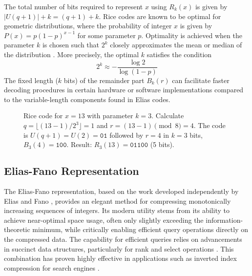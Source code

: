 The total number of bits required to represent $x$ using $R_k(x)$ is given by $|U(q+1)| + k = (q+1) + k$. Rice codes are known to be optimal for geometric distributions, where the probability of integer $x$ is given by $P(x) = p(1-p)^{x-1}$ for some parameter $p$. Optimality is achieved when the parameter $k$ is chosen such that $2^k$ closely approximates the mean or median of the distribution \cite{witten1999managing}. More precisely, the optimal $k$ satisfies the condition
\[ 2^k \approx -\frac{\log 2}{\log(1-p)} \]
The fixed length ($k$ bits) of the remainder part $B_k(r)$ can facilitate faster decoding procedures in certain hardware or software implementations compared to the variable-length components found in Elias codes.

\begin{figure}[hbtp]
    \centering
    \caption{Rice code for $x=13$ with parameter $k=3$. Calculate $q = \lfloor (13-1) / 2^3 \rfloor = 1$ and $r = (13-1) \pmod 8 = 4$. The code is $U(q+1)=U(2)=\texttt{01}$ followed by $r=4$ in $k=3$ bits, $B_3(4)=\texttt{100}$. Result: $R_3(13)=\texttt{01100}$ (5 bits).}
    \label{fig:rice_code_example}
\end{figure}

\subsection{Elias-Fano Representation} \label{sec:elias_fano_code}

The Elias-Fano representation, based on the work developed independently by Elias \cite{Elias1975} and Fano \cite{Fano1971}, provides an elegant method for compressing monotonically increasing sequences of integers. Its modern utility stems from its ability to achieve near-optimal space usage, often only slightly exceeding the information-theoretic minimum, while critically enabling efficient query operations directly on the compressed data. The capability for efficient queries relies on advancements in succinct data structures, particularly for rank and select operations \cite{sadakane2006squeezing}. This combination has proven highly effective in applications such as inverted index compression for search engines \cite{vigna2013quasi, EFVenturini2014}.

